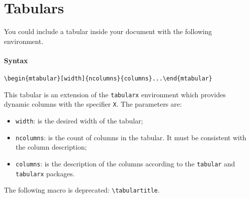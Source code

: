 \documentclass[book,taskpackage,specpackage,codepackage]{upmethodology-document}
\begin{document}
\section{Tabulars}

You could include a tabular inside your document with the following environment.

\paragraph{Syntax} \texttt{{\textbackslash}begin\{mtabular\}[width]\{ncolumns\}\{columns\}...{\textbackslash}end\{mtabular\}}

This tabular is an extension of the \texttt{tabularx} environment which provides dynamic columns with the specifier \texttt{X}. The parameters are:
\begin{itemize}
\item \texttt{width}: is the desired width of the tabular;

\item \texttt{ncolumns}: is the count of columns in the tabular. It must be consistent with the column description;

\item \texttt{columns}: is the description of the columns according to the \texttt{tabular} and \texttt{tabularx} packages.

\end{itemize}


\begin{upmcaution}
	The following macro is deprecated: \texttt{{\textbackslash}tabulartitle}. \end{upmcaution}
\end{document}
